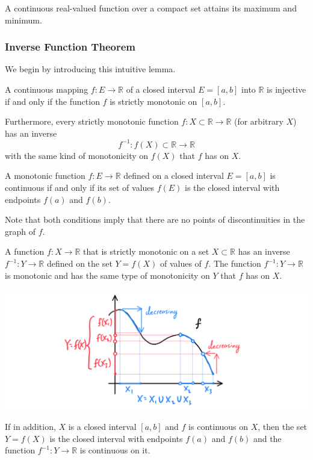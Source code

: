     \begin{theorem}
      A continuous real-valued function over a compact set attains its maximum and minimum. 
    \end{theorem}

  \subsubsection{Inverse Function Theorem}

    We begin by introducing this intuitive lemma. 
    \begin{lemma}
      A continuous mapping $f: E \longrightarrow \mathbb{R}$ of a closed interval $E = [a,b]$ into $\mathbb{R}$ is injective if and only if the function $f$ is strictly monotonic on $[a,b]$. 

      Furthermore, every strictly monotonic function $f: X \subset \mathbb{R} \longrightarrow \mathbb{R}$ (for arbitrary $X$) has an inverse 
      \[f^{-1}: f(X) \subset \mathbb{R} \longrightarrow \mathbb{R}\]
      with the same kind of monotonicity on $f(X)$ that $f$ has on $X$. 
    \end{lemma}

    \begin{lemma}
      A monotonic function $f: E \longrightarrow \mathbb{R}$ defined on a closed interval $E = [a,b]$ is continuous if and only if its set of values $f(E)$ is the closed interval with endpoints $f(a)$ and $f(b)$. 

      Note that both conditions imply that there are no points of discontinuities in the graph of $f$. 
    \end{lemma}


    \begin{theorem}
    A function $f: X \longrightarrow \mathbb{R}$ that is strictly monotonic on a set $X \subset \mathbb{R}$ has an inverse $f^{-1}: Y \longrightarrow \mathbb{R}$ defined on the set $Y = f(X)$ of values of $f$. The function $f^{-1}: Y \longrightarrow \mathbb{R}$ is monotonic and has the same type of monotonicity on $Y$ that $f$ has on $X$. 
    \begin{center}
        \includegraphics[scale=0.25]{img/Inverse_Function_Theorem_Analysis.PNG}
    \end{center}
    If in addition, $X$ is a closed interval $[a,b]$ and $f$ is continuous on $X$, then the set $Y = f(X)$ is the closed interval with endpoints $f(a)$ and $f(b)$ and the function $f^{-1}: Y \longrightarrow \mathbb{R}$ is continuous on it.
    \end{theorem}

